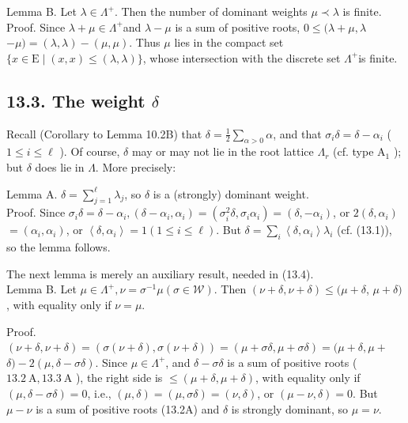 \documentclass[10pt]{article}
\begin{document}
Lemma B. Let $\lambda \in \Lambda^{+}$. Then the number of dominant weights $\mu \prec \lambda$ is finite.\\
Proof. Since $\lambda+\mu \in \Lambda^{+}$and $\lambda-\mu$ is a sum of positive roots, $0 \leq(\lambda+\mu, \lambda$ $-\mu)=(\lambda, \lambda)-(\mu, \mu)$. Thus $\mu$ lies in the compact set $\{x \in \mathrm{E} \mid(x, x) \leq(\lambda, \lambda)\}$, whose intersection with the discrete set $\Lambda^{+}$is finite.

\subsection*{13.3. The weight $\delta$}
Recall (Corollary to Lemma 10.2B) that $\delta=\frac{1}{2} \sum_{\alpha>0} \alpha$, and that $\sigma_{i} \delta=\delta-\alpha_{i}$ ( $1 \leq i \leq \ell$ ). Of course, $\delta$ may or may not lie in the root lattice $\Lambda_{r}$ (cf. type $\mathrm{A}_{1}$ ); but $\delta$ does lie in $\Lambda$. More precisely:

Lemma A. $\delta=\sum_{j=1}^{\ell} \lambda_{j}$, so $\delta$ is a (strongly) dominant weight.\\
Proof. Since $\sigma_{i} \delta=\delta-\alpha_{i},\left(\delta-\alpha_{i}, \alpha_{i}\right)=\left(\sigma_{i}^{2} \delta, \sigma_{i} \alpha_{i}\right)=\left(\delta,-\alpha_{i}\right)$, or $2\left(\delta, \alpha_{i}\right)$ $=\left(\alpha_{i}, \alpha_{i}\right)$, or $\left\langle\delta, \alpha_{i}\right\rangle=1(1 \leq i \leq \ell)$. But $\delta=\sum_{i}\left\langle\delta, \alpha_{i}\right\rangle \lambda_{i}$ (cf. (13.1)), so the lemma follows.

The next lemma is merely an auxiliary result, needed in (13.4).\\
Lemma B. Let $\mu \in \Lambda^{+}, \nu=\sigma^{-1} \mu(\sigma \in \mathscr{W})$. Then $(\nu+\delta, \nu+\delta) \leq(\mu+\delta$, $\mu+\delta)$, with equality only if $\nu=\mu$.

Proof. $(\nu+\delta, \nu+\delta)=(\sigma(\nu+\delta), \sigma(\nu+\delta))=(\mu+\sigma \delta, \mu+\sigma \delta)=(\mu+\delta, \mu+$ $\delta)-2(\mu, \delta-\sigma \delta)$. Since $\mu \in \Lambda^{+}$, and $\delta-\sigma \delta$ is a sum of positive roots ( $13.2 \mathrm{~A}, 13.3 \mathrm{~A}$ ), the right side is $\leq(\mu+\delta, \mu+\delta)$, with equality only if $(\mu, \delta-\sigma \delta)=0$, i.e., $(\mu, \delta)=(\mu, \sigma \delta)=(\nu, \delta)$, or $(\mu-\nu, \delta)=0$. But $\mu-\nu$ is a sum of positive roots (13.2A) and $\delta$ is strongly dominant, so $\mu=\nu$.
\end{document}
